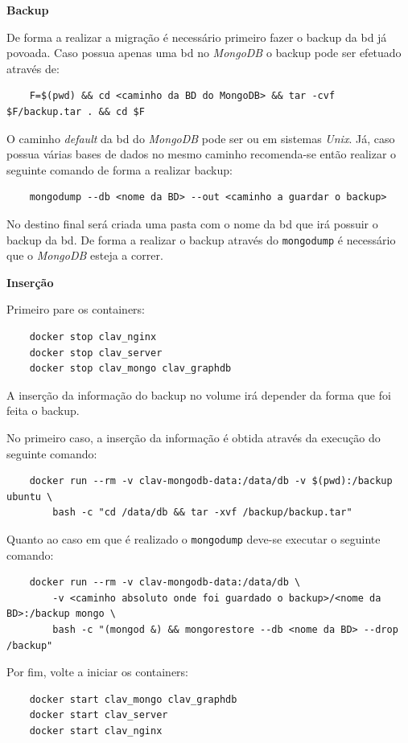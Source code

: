 \begin{description}
    \item \textbf{Backup}

    De forma a realizar a migração é necessário primeiro fazer o backup da \acrshort{bd} já povoada. Caso possua apenas uma \acrshort{bd} no \textit{MongoDB} o backup pode ser efetuado através de:

    \begin{verbatim}
    F=$(pwd) && cd <caminho da BD do MongoDB> && tar -cvf $F/backup.tar . && cd $F
    \end{verbatim}

    O caminho \textit{default} da \acrshort{bd} do \textit{MongoDB} pode ser  ou  em sistemas \textit{Unix}.
    Já, caso possua várias bases de dados no mesmo caminho recomenda-se então realizar o seguinte comando de forma a realizar backup:

    \begin{verbatim}
    mongodump --db <nome da BD> --out <caminho a guardar o backup>
    \end{verbatim}

    No destino final será criada uma pasta com o nome da \acrshort{bd} que irá possuir o backup da \acrshort{bd}.
    De forma a realizar o backup através do \texttt{mongodump} é necessário que o \textit{MongoDB} esteja a correr.

    \item \textbf{Inserção}

    Primeiro pare os containers:
    \begin{verbatim}
    docker stop clav_nginx
    docker stop clav_server
    docker stop clav_mongo clav_graphdb
    \end{verbatim}

    A inserção da informação do backup no volume irá depender da forma que foi feita o backup. 

    No primeiro caso, a inserção da informação é obtida através da execução do seguinte comando:
    \begin{verbatim}
    docker run --rm -v clav-mongodb-data:/data/db -v $(pwd):/backup ubuntu \
        bash -c "cd /data/db && tar -xvf /backup/backup.tar"
    \end{verbatim}

    Quanto ao caso em que é realizado o \texttt{mongodump} deve-se executar o seguinte comando:
    \begin{verbatim}
    docker run --rm -v clav-mongodb-data:/data/db \
        -v <caminho absoluto onde foi guardado o backup>/<nome da BD>:/backup mongo \
        bash -c "(mongod &) && mongorestore --db <nome da BD> --drop /backup"
    \end{verbatim}

    Por fim, volte a iniciar os containers:
    \begin{verbatim}
    docker start clav_mongo clav_graphdb
    docker start clav_server
    docker start clav_nginx
    \end{verbatim}
\end{description}

